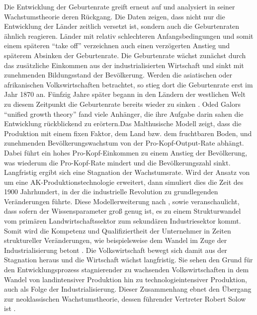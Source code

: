 Die Entwicklung der Geburtenrate greift \citet{Galor.2014} erneut auf und analysiert in seiner Wachstumstheorie deren R{\"u}ckgang. Die Daten zeigen, dass nicht nur die Entwicklung der L{\"a}nder zeitlich versetzt ist, sondern auch die Geburtenraten {\"a}hnlich reagieren. L{\"a}nder mit relativ schlechteren Anfangsbedingungen und somit einem sp{\"a}teren "`take off"' verzeichnen auch einen verz{\"o}gerten Anstieg und sp{\"a}terem Absinken der Geburtenrate. Die Geburtenrate w{\"a}chst zun{\"a}chst durch das zus{\"a}tzliche Einkommen aus der industrialisierten Wirtschaft und sinkt mit zunehmenden Bildungsstand der Bev{\"o}lkerung. Werden die asiatischen oder afrikanischen Volkswirtschaften betrachtet, so stieg dort die Geburtenrate erst im Jahr 1870 an. F{\"u}nfzig Jahre sp{\"a}ter begann in den L{\"a}ndern der westlichen Welt zu diesem Zeitpunkt die Geburtenrate bereits wieder zu sinken \citep{Galor.2014}.
Oded Galors "`unified growth theory"' fand viele Anh{\"a}nger, die ihre Aufgabe darin sahen die Entwicklung r{\"u}ckblickend zu er{\"o}rtern.\newline Das Malthusische Modell zeigt, dass die Produktion mit einem fixen Faktor, dem Land bzw. dem fruchtbaren Boden, und zunehmenden Bev{\"o}lkerungswachstum von der Pro-Kopf-Output-Rate abh{\"a}ngt. Dabei führt ein hohes Pro-Kopf-Einkommen zu einem Anstieg der Bev{\"o}lkerung, was wiederum die Pro-Kopf-Rate mindert und die Bev{\"o}lkerungszahl sinkt.  Langfristig ergibt sich eine Stagnation der Wachstumsrate. Wird der Ansatz von \citet{Malthus.1798} um eine AK-Produktionstechnologie erweitert, dann simuliert dies die Zeit des 1900 Jahrhundert, in der die industrielle Revolution zu grundlegenden Ver{\"a}nderungen f{\"u}hrte. Diese Modellerweiterung nach \citet{Hansen.2002}, sowie \citet{Ashraf.2008} veranschaulicht, dass sofern der Wissensparameter gro{\ss} genug ist, es zu einem Strukturwandel vom prim{\"a}ren Landwirtschaftssektor zum sekund{\"a}ren Industriesektor kommt. Somit wird die Kompetenz und Qualifiziertheit der Unternehmer in Zeiten struktureller Ver{\"a}nderungen, wie beispielsweise dem Wandel im Zuge der Industrialisierung betont \cite{Galor.1997}.
Die Volkswirtschaft bewegt sich damit aus der Stagnation heraus und die Wirtschaft w{\"a}chst langfristig. Sie sehen den Grund für den Entwicklungsprozess stagnierender zu wachsenden Volkswirtschaften in dem Wandel von landintensiver Produktion hin zu technologieintensiver Produktion, auch als Folge der Industrialisierung. Dieser Zusammenhang ebnet den {\"U}bergang zur neoklassischen Wachstumstheorie, dessen f{\"u}hrender Vertreter Robert Solow ist \citep{Hansen.2002}.


